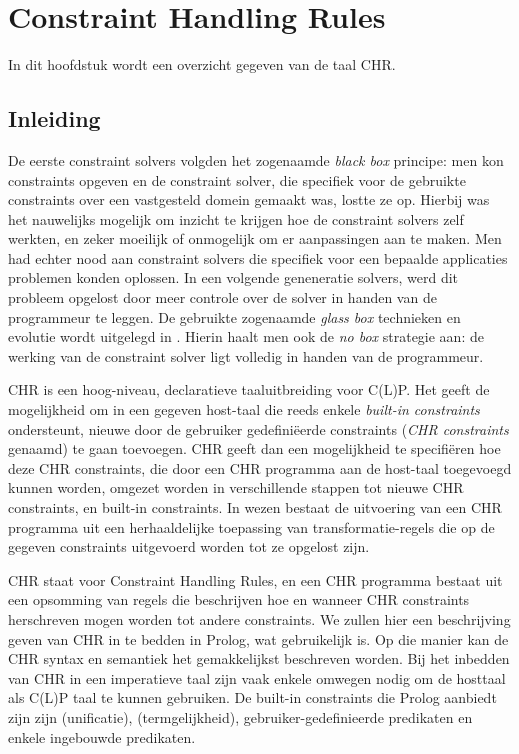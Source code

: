 \chapter{Constraint Handling Rules}

In dit hoofdstuk wordt een overzicht gegeven van de taal CHR.

\section{Inleiding}

De eerste constraint solvers volgden het zogenaamde {\em black box} principe: men kon constraints opgeven en de constraint solver, die specifiek voor de gebruikte constraints over een vastgesteld domein gemaakt was, lostte ze op. Hierbij was het nauwelijks mogelijk om inzicht te krijgen hoe de constraint solvers zelf werkten, en zeker moeilijk of onmogelijk om er aanpassingen aan te maken. Men had echter nood aan constraint solvers die specifiek voor een bepaalde applicaties problemen konden oplossen. In een volgende geneneratie solvers, werd dit probleem opgelost door meer controle over de solver in handen van de programmeur te leggen. De gebruikte zogenaamde  {\em glass box} technieken en evolutie wordt uitgelegd in \cite{chr}. Hierin haalt men ook de {\em no box} strategie aan: de werking van de constraint solver ligt volledig in handen van de programmeur.

CHR is een hoog-niveau, declaratieve taaluitbreiding voor C(L)P. Het geeft de mogelijkheid om in een gegeven host-taal die reeds enkele {\em built-in constraints} ondersteunt, nieuwe door de gebruiker gedefini\"eerde constraints ({\em CHR constraints} genaamd) te gaan toevoegen. CHR geeft dan een mogelijkheid te specifi\"eren hoe deze CHR constraints, die door een CHR programma aan de host-taal toegevoegd kunnen worden, omgezet worden in verschillende stappen tot nieuwe CHR constraints, en built-in constraints. In wezen bestaat de uitvoering van een CHR programma uit een herhaaldelijke toepassing van transformatie-regels die op de gegeven constraints uitgevoerd worden tot ze opgelost zijn.

CHR staat voor Constraint Handling Rules, en een CHR programma bestaat uit een opsomming van regels die beschrijven hoe en wanneer CHR constraints herschreven mogen worden tot andere constraints. We zullen hier een beschrijving geven van CHR in te bedden in Prolog, wat gebruikelijk is. Op die manier kan de CHR syntax en semantiek het gemakkelijkst beschreven worden. Bij het inbedden van CHR in een imperatieve taal zijn vaak enkele omwegen nodig om de hosttaal als C(L)P taal te kunnen gebruiken. De built-in constraints die Prolog aanbiedt zijn zijn \code{=} (unificatie), \code{==} (termgelijkheid), gebruiker-gedefinieerde predikaten en enkele ingebouwde predikaten.

